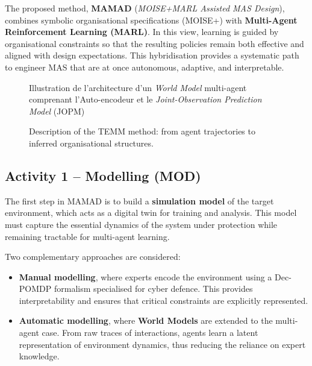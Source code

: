 \documentclass[a4paper,10pt,twocolumn]{article}
\begin{document}
The proposed method, \textbf{MAMAD} (\textit{MOISE+MARL Assisted MAS Design}),
combines symbolic organisational specifications (MOISE+) with
\textbf{Multi-Agent Reinforcement Learning (MARL)}. In this view,
learning is guided by organisational constraints so that the resulting
policies remain both effective and aligned with design expectations.
This hybridisation provides a systematic path to engineer MAS that are
at once autonomous, adaptive, and interpretable.

\begin{figure}[h!]
    \centering
    \resizebox{0.5\textwidth}{!}{%
        
    }
    \caption{Illustration de l'architecture d'un \textit{World Model} multi-agent comprenant l'Auto-encodeur et le \textit{Joint-Observation Prediction Model} (JOPM)}
    \label{fig:single_agent_world_model}
\end{figure}

\begin{figure}[h!]
    \centering
    \resizebox{0.95\textwidth}{!}{%
        
    }
    \caption{Description of the TEMM method: from agent trajectories to inferred organisational structures.}
    \label{fig:mm_synthesis}
\end{figure}

\subsection*{Activity 1 – Modelling (MOD)}

The first step in MAMAD is to build a \textbf{simulation model} of the
target environment, which acts as a digital twin for training and
analysis. This model must capture the essential dynamics of the system
under protection while remaining tractable for multi-agent learning.

Two complementary approaches are considered:
\begin{itemize}
    \item \textbf{Manual modelling}, where experts encode the environment
          using a Dec-POMDP formalism specialised for cyber defence. This
          provides interpretability and ensures that critical constraints are
          explicitly represented.
    \item \textbf{Automatic modelling}, where \textbf{World Models} are
          extended to the multi-agent case. From raw traces of interactions,
          agents learn a latent representation of environment dynamics, thus
          reducing the reliance on expert knowledge.
\end{itemize}
\end{document}
